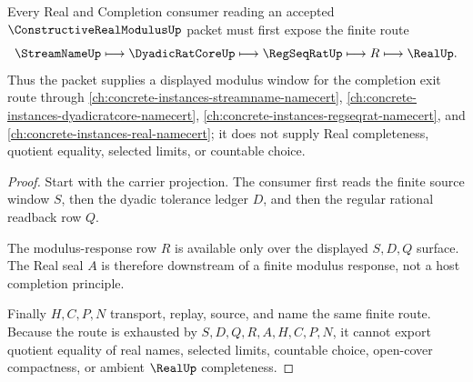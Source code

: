 \begin{theorem}
\label{thm:constructive-real-modulus-real-completion-route}
Every Real and Completion consumer reading an accepted
$\ConstructiveRealModulusUp$ packet must first expose the finite route
$$
\StreamNameUp \longmapsto \DyadicRatCoreUp \longmapsto \RegSeqRatUp
\longmapsto R \longmapsto \RealUp .
$$
Thus the packet supplies a displayed modulus window for the completion exit
route through \autoref{ch:concrete-instances-streamname-namecert},
\autoref{ch:concrete-instances-dyadicratcore-namecert},
\autoref{ch:concrete-instances-regseqrat-namecert}, and
\autoref{ch:concrete-instances-real-namecert}; it does not supply Real
completeness, quotient equality, selected limits, or countable choice.
\end{theorem}
\begin{proof}
Start with the carrier projection. The consumer first reads the finite source
window $S$, then the dyadic tolerance ledger $D$, and then the regular rational
readback row $Q$.

The modulus-response row $R$ is available only over the displayed $S,D,Q$
surface. The Real seal $A$ is therefore downstream of a finite modulus response,
not a host completion principle.

Finally $H,C,P,N$ transport, replay, source, and name the same finite route.
Because the route is exhausted by $S,D,Q,R,A,H,C,P,N$, it cannot export quotient
equality of real names, selected limits, countable choice, open-cover
compactness, or ambient $\RealUp$ completeness.
\end{proof}


\begin{closurestatus}{\ConstructiveRealModulusUp}
  \theoryclosure{\seedClosure}
  \formalstatus{\unformalizedV}
\end{closurestatus}
